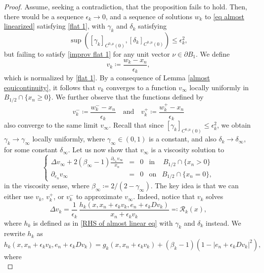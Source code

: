 \documentclass[reqno,11pt]{amsart}
\newcommand{\1}{\mathds{1}}
\numberwithin{equation}{section}
\begin{document}
\begin{proof}
Assume, seeking a contradiction, that the proposition fails to hold. Then, there would be a sequence $\epsilon_k \to 0$, and a sequence of solutions $w_k$ to \eqref{eq almost linearized} satisfying \eqref{flat 1}, with $\gamma_k$ and $\delta_k$ satisfying
\begin{equation}\label{coefs converging to constant}
    \sup\left([\gamma_k]_{C^{0,\mu}(0)}, [\delta_k]_{C^{0,\mu}(0)}\right) \leq \epsilon_k^2,
\end{equation}
but failing to satisfy \eqref{improv flat 1} for any unit vector $\nu \in \partial B_1$. We define
$$
  v_k \coloneqq \frac{w_k - x_n}{\epsilon_k},  
$$
which is normalized by \eqref{flat 1}. By a consequence of Lemma \ref{almost equicontinuity}, it follows that $v_k$ converges to a function $v_\infty$ locally uniformly in $B_{1/2}\cap \{x_n \geq 0\}$. We further observe that the functions defined by
$$
    v_k^- \coloneqq \frac{w_k^- - x_n}{\epsilon_k} \quad \text{and} \quad v_k^+ \coloneqq \frac{w_k^+ - x_n}{\epsilon_k}
$$
also converge to the same limit $v_\infty$. Recall that since $[\gamma_k]_{C^{0,\mu}(0)} \leq \epsilon_k^2$, we obtain $\gamma_k \to \gamma_\infty$ locally uniformly, where $\gamma_\infty \in (0,1)$ is a constant, and also $\delta_k \to \delta_\infty$, for some constant $\delta_\infty$. Let us now show that $v_\infty$ is a viscosity solution to
\begin{equation}\label{linearized eq DSS}
\left\{
    \begin{array}{rllcl}
        \displaystyle \Delta v_\infty + 2(\beta_\infty-1)\frac{\partial_{e_n}v_\infty}{x_n} & = & 0 & \mathrm{in} & \,B_{1/2}\cap \{x_n>0\}\\
     \partial_{e_n}v_\infty & = & 0 & \mathrm{on} &  B_{1/2}\cap \{x_n = 0\},
    \end{array}
\right.
\end{equation}
in the viscosity sense, where $\beta_\infty \coloneqq 2/(2-\gamma_\infty)$. The key idea is that we can either use $v_k$, $v_k^+$, or $v_k^-$ to approximate $v_\infty$. Indeed, notice that $v_k$ solves
$$
    \Delta v_k = \frac{1}{\epsilon_k}\,\frac{h_k(x,x_n + \epsilon_k v_k,e_n + \epsilon_k Dv_k)}{x_n + \epsilon_k v_k} \eqqcolon \mathcal{R}_k(x),
$$
where $h_k$ is defined as in \eqref{RHS of almost linear eq} with $\gamma_k$ and $\delta_k$ instead. We rewrite $h_k$ as
$$
   h_k(x,x_n + \epsilon_k v_k,e_n + \epsilon_k Dv_k) = g_k\left(x,x_n + \epsilon_k v_k\right) + (\beta_k-1)\left(1-|e_n + \epsilon_k Dv_k|^2\right),
$$
where
$$
$$
\end{proof}
\end{document}
